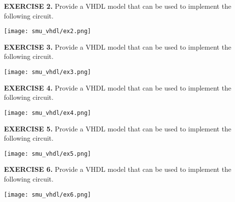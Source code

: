 \vspace{20pt}
\noindent
\begin{minipage}[t]{0.5\textwidth}
\textbf{EXERCISE 2.}
Provide a VHDL model that can be used to implement the following circuit.
\end{minipage}
\begin{minipage}[t]{0.47\textwidth}
\vspace{0pt}\raggedright
\centering
\texttt{[image: smu\_vhdl/ex2.png]}
\end{minipage}

\vspace{20pt}
\noindent
\begin{minipage}[t]{0.5\textwidth}
\textbf{EXERCISE 3.}
Provide a VHDL model that can be used to implement the following circuit. 
\end{minipage}
\begin{minipage}[t]{0.47\textwidth}
\vspace{0pt}\raggedright
\centering
\texttt{[image: smu\_vhdl/ex3.png]}
\end{minipage}

\vspace{20pt}
\noindent
\begin{minipage}[t]{0.5\textwidth}
\textbf{EXERCISE 4.}
Provide a VHDL model that can be used to implement the following circuit.
\end{minipage}
\begin{minipage}[t]{0.47\textwidth}
\vspace{0pt}\raggedright
\centering
\texttt{[image: smu\_vhdl/ex4.png]}
\end{minipage}

\vspace{20pt}
\noindent
\begin{minipage}[t]{0.5\textwidth}
\textbf{EXERCISE 5.}
Provide a VHDL model that can be used to implement the following circuit.
\end{minipage}
\begin{minipage}[t]{0.47\textwidth}
\vspace{0pt}\raggedright
\centering
\texttt{[image: smu\_vhdl/ex5.png]}
\end{minipage}

\vspace{20pt}
\noindent
\begin{minipage}[t]{0.5\textwidth}
\textbf{EXERCISE 6.}
Provide a VHDL model that can be used to implement the following circuit.
\end{minipage}
\begin{minipage}[t]{0.47\textwidth}
\vspace{0pt}\raggedright
\centering
\texttt{[image: smu\_vhdl/ex6.png]}
\end{minipage}




